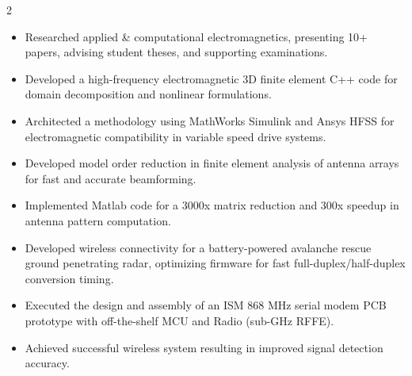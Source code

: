 \documentclass[9pt,a4paper,ragged2e,withhyper]{altacv} %
\begin{document}
\begin{paracol}{2}
\begin{itemize}
\item Researched applied \& computational electromagnetics, presenting 10+ papers, advising student theses, and supporting examinations.
\item Developed a high-frequency electromagnetic 3D finite element C++ code for domain decomposition and nonlinear formulations.
\item Architected a methodology using MathWorks Simulink and Ansys HFSS for electromagnetic compatibility in variable speed drive systems.
\end{itemize}

\divider

\begin{itemize}
\item Developed model order reduction in finite element analysis of antenna arrays for fast and accurate beamforming.
\item Implemented Matlab code for a 3000x matrix reduction and 300x speedup in antenna pattern computation.
\end{itemize}
\divider

\begin{itemize}
\item Developed wireless connectivity for a battery-powered avalanche rescue ground penetrating radar, optimizing firmware for fast full-duplex/half-duplex conversion timing.
\item Executed the design and assembly of an ISM 868 MHz serial modem PCB prototype with off-the-shelf MCU and Radio (sub-GHz RFFE).
\item Achieved successful wireless system resulting in improved signal detection accuracy.
\end{itemize}


\end{paracol}
\end{document}
